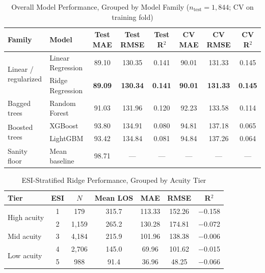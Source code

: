 \documentclass[conference]{IEEEtran}
\begin{document}
\begin{table}[!t]
\centering
\caption{Overall Model Performance, Grouped by Model Family
($n_{\mathrm{test}}=1{,}844$; CV on training fold)}
\label{tab:overall}
\renewcommand{\arraystretch}{1.2}
\begin{tabular}{p{2.0cm}lcccccc}
\toprule
\textbf{Family} & \textbf{Model} &
\textbf{Test MAE} & \textbf{Test RMSE} & \textbf{Test R$^2$} &
\textbf{CV MAE} & \textbf{CV RMSE} & \textbf{CV R$^2$} \\
\midrule
\multirow{2}{*}{\parbox{2.0cm}{Linear /\\regularized}}
 & Linear Regression & 89.10 & 130.35 & 0.141 & 90.01 & 131.33 & 0.145 \\
 & Ridge Regression  & \textbf{89.09} & \textbf{130.34} & \textbf{0.141} & \textbf{90.01} & \textbf{131.33} & \textbf{0.145} \\
\midrule
Bagged trees
 & Random Forest     & 91.03 & 131.96 & 0.120 & 92.23 & 133.58 & 0.114 \\
\midrule
\multirow{2}{*}{\parbox{2.0cm}{Boosted trees}}
 & XGBoost           & 93.80 & 134.91 & 0.080 & 94.81 & 137.18 & 0.065 \\
 & LightGBM          & 93.42 & 134.84 & 0.081 & 94.84 & 137.26 & 0.064 \\
\midrule
Sanity floor
 & Mean baseline     & 98.71 &   ---  &  ---  &  ---  &   ---  &  ---  \\
\bottomrule
\end{tabular}
\end{table}

\begin{table}[H]
\centering
\caption{ESI-Stratified Ridge Performance, Grouped by Acuity Tier}
\label{tab:esi}
\renewcommand{\arraystretch}{1.2}
\begin{tabular}{p{1.9cm}cccccc}
\toprule
\textbf{Tier} & \textbf{ESI} & \textbf{$N$} & \textbf{Mean LOS} & \textbf{MAE} & \textbf{RMSE} & \textbf{R$^2$} \\
\midrule
\multirow{2}{*}{High acuity}
 & 1 &   179 & 315.7 & 113.33 & 152.26 & $-$0.158 \\
 & 2 & 1{,}159 & 265.2 & 130.28 & 174.81 & $-$0.072 \\
\midrule
Mid acuity
 & 3 & 4{,}184 & 215.9 & 101.96 & 138.38 & $-$0.006 \\
\midrule
\multirow{2}{*}{Low acuity}
 & 4 & 2{,}706 & 145.0 &  69.96 & 101.62 & $-$0.015 \\
 & 5 &   988 &  91.4 &  36.96 &  48.25 & $-$0.066 \\
\bottomrule
\end{tabular}
\end{table}
\end{document}
